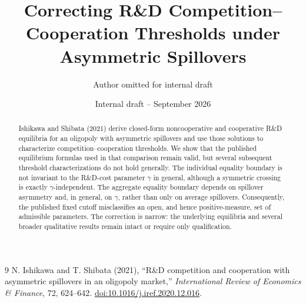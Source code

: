 \documentclass[11pt]{article}
\title{Correcting R\&D Competition--Cooperation Thresholds under Asymmetric Spillovers}
\author{Author omitted for internal draft}
\date{Internal draft -- September 2026}
\begin{document}
\maketitle

\begin{abstract}
Ishikawa and Shibata (2021) derive closed-form noncooperative and cooperative R\&D equilibria for an oligopoly with asymmetric spillovers and use those solutions to characterize competition--cooperation thresholds. We show that the published equilibrium formulas used in that comparison remain valid, but several subsequent threshold characterizations do not hold generally. The individual equality boundary is not invariant to the R\&D-cost parameter $\gamma$ in general, although a symmetric crossing is exactly $\gamma$-independent. The aggregate equality boundary depends on spillover asymmetry and, in general, on $\gamma$, rather than only on average spillovers. Consequently, the published fixed cutoff misclassifies an open, and hence positive-measure, set of admissible parameters. The correction is narrow: the underlying equilibria and several broader qualitative results remain intact or require only qualification.
\end{abstract}







\appendix





\begin{thebibliography}{9}
N. Ishikawa and T. Shibata (2021),
``R\&D competition and cooperation with asymmetric spillovers in an oligopoly market,''
\textit{International Review of Economics \& Finance}, 72, 624--642.
\href{https://doi.org/10.1016/j.iref.2020.12.016}{doi:10.1016/j.iref.2020.12.016}.
\end{thebibliography}
\end{document}
